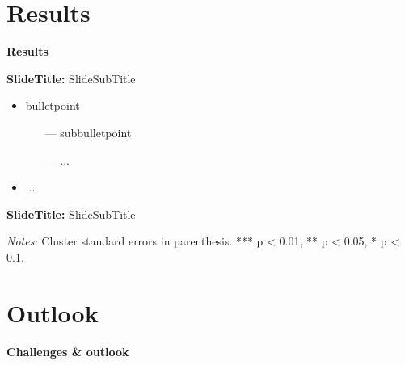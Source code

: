 \documentclass{beamer} %
\begin{document}
\section{Results}
{
	\begin{frame}[plain]		
		\vspace{1cm}
		{\color{white}\LARGE \textbf{Results}}
	\end{frame}
	\addtocounter{framenumber}{-1}
}

\begin{frame}{\textbf{SlideTitle:} SlideSubTitle}
	\begin{itemize}
	    \item bulletpoint
    	\begin{itemize}
    	    \item[---] subbulletpoint
    	    \item[---] ...
    	\end{itemize}
    	\item ...
	\end{itemize}
\end{frame}

\begin{frame}{\textbf{SlideTitle:} SlideSubTitle}
    \centering
	\begin{threeparttable}[hb]
    \centering
    \resizebox{.7\textwidth}{!}{
        
    }
    \begin{tablenotes}[flushleft]
            \item\tiny\textit{Notes:} Cluster standard errors in parenthesis. *** p < 0.01, ** p < 0.05, * p < 0.1.
    \end{tablenotes}
\end{threeparttable}
\end{frame}

\section{Outlook}
{
	\begin{frame}[plain]		
		\vspace{1cm}
		{\color{white}\LARGE \textbf{Challenges \& outlook}}
	\end{frame}
	\addtocounter{framenumber}{-1}
}
\end{document}
